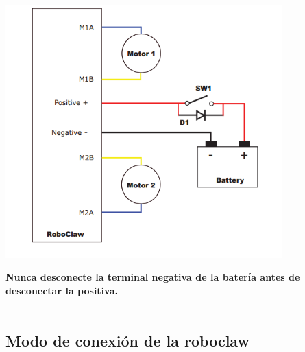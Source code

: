 \documentclass[user_manual.tex]{subfiles}
\begin{document}
\begin{center}
\includegraphics[width=0.8\textwidth]{Figures/Hardware/Partes/Motores.png}
\label{fig:Hardware:Partes:Motores}
\end{center}

\textbf{Nunca desconecte la terminal negativa de la batería antes de desconectar la positiva.}\\
\\

\subsection{Modo de conexión de la roboclaw}




 
\end{document}
